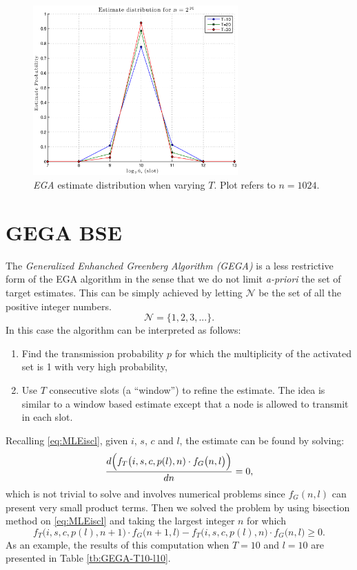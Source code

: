 \documentclass[11pt,a4paper,twoside,openright]{book}
\newcommand{\fg}{f_{G}}
\begin{document}
\begin{figure}[H]
\begin{center}
\includegraphics[width=0.7\textwidth]{matlab/Greenberg_MLE/greenberg-mle-fixed-n-varying-T}
\caption[\emph{EGA}: Estimate distribution when varying $T$.]{\emph{EGA} estimate distribution when varying $T$. Plot refers to $n=1024$.}
\label{fg:EGA-peaks-fixed-n-varing-T}
\end{center}
\end{figure}

\section{GEGA BSE}
\label{sc:GEGA BSE}
The  \emph{Generalized Enhanched Greenberg Algorithm (GEGA)} is a less restrictive form of the EGA algorithm in the sense that we do not  limit \emph{a-priori} the set  of target estimates. This can be simply achieved by letting $\mathcal{N}$ be the set of all the positive integer numbers.
\begin{equation*}
\mathcal{N}=\{1,2,3,...\}.
\end{equation*}
In this case the algorithm can be interpreted as follows:
\begin{enumerate}
\item Find the transmission probability $p$ for which the multiplicity of the activated set is 1 with very high probability,
\item Use $T$ consecutive slots (a ``window'') to refine the estimate. The idea is similar to a window based estimate except that a node is allowed to transmit in each slot.
\end{enumerate}

\noindent Recalling \eqref{eq:MLEiscl}, given $i$, $s$, $c$ and $l$, the estimate can be found by solving:
\begin{equation}
\frac{d\Bigl( f_{T}\bigl(i,s,c,p(l),n)\cdot \fg\bigl(n,l\bigr)\Bigr)}{dn}=0,
\end{equation}
which is not trivial to solve and involves numerical problems since $\fg(n,l)$ can present very small product terms. Then we solved the problem by using bisection method on  \eqref{eq:MLEiscl} and taking the largest integer $n$ for which
\begin{equation}
f_{T}\bigl(i,s,c,p(l),n+1)\cdot \fg\bigl(n+1,l\bigr)-f_{T}\bigl(i,s,c,p(l),n)\cdot \fg\bigl(n,l\bigr)\geq0.
\end{equation}
As an example, the results of this computation when $T=10$ and $l=10$ are presented in Table \ref{tb:GEGA-T10-l10}.
\end{document}
